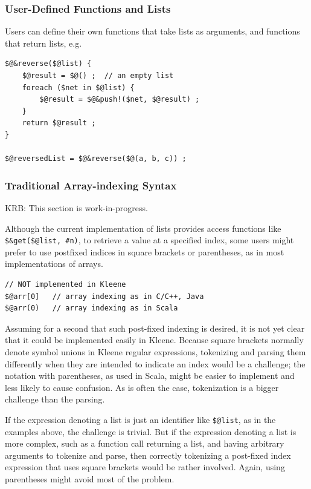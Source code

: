 \documentclass[letterpaper,12pt]{article}
\begin{document}
\subsubsection{User-Defined Functions and Lists}


Users can define their own functions that take lists as arguments, and functions
that return lists, e.g.\@

\begin{Verbatim}[fontsize=\small]
$@&reverse($@list) {
    $@result = $@() ;  // an empty list
    foreach ($net in $@list) {
        $@result = $@&push!($net, $@result) ;
    }
    return $@result ;
}

$@reversedList = $@&reverse($@(a, b, c)) ;
\end{Verbatim}


\subsubsection{Traditional Array-indexing Syntax}


KRB:  This section is work-in-progress.

Although the current implementation of lists provides access functions like
\verb!$&get($@list, #n)!, to retrieve a value at a specified index, 
some users might prefer to use postfixed indices in
square brackets or parentheses, as in most implementations of arrays.

\begin{Verbatim}[fontsize=\small]
// NOT implemented in Kleene
$@arr[0]   // array indexing as in C/C++, Java
$@arr(0)   // array indexing as in Scala
\end{Verbatim}

\noindent
Assuming for a second that such post-fixed indexing is desired, it is not yet
clear that it could be implemented easily in Kleene.
Because square brackets normally denote symbol unions in Kleene regular
expressions, tokenizing and
parsing them differently when they are intended to indicate an index would be a
challenge; the notation with parentheses, as used in Scala, might be easier to
implement and
less likely to cause confusion.  As is often the case, tokenization is a bigger
challenge than the parsing.

If the expression denoting a list is just an
identifier like \verb!$@list!, as in the examples above, the challenge is trivial.  But if the
expression denoting a list is more complex, such as a function call returning a list,
and having arbitrary arguments to tokenize and parse, then correctly tokenizing a
post-fixed index expression that uses square brackets would be rather involved.
Again, using parentheses might avoid most of the problem.
\end{document}

